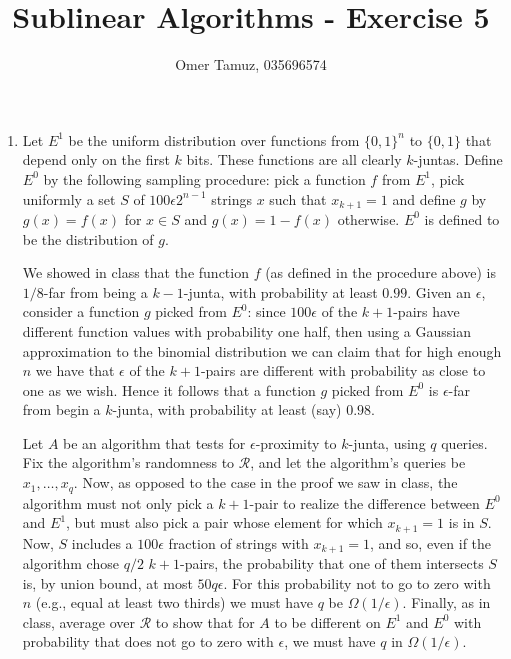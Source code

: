 \documentclass[11pt]{article} \usepackage{amssymb}
\begin{document}
\title{Sublinear Algorithms - Exercise 5}

 \author{Omer Tamuz, 035696574}
\maketitle
\begin{enumerate}
\item 
Let $E^1$ be the uniform distribution over functions from $\{0,1\}^n$ to
$\{0,1\}$ that depend only on the first $k$ bits. These functions are all
clearly $k$-juntas. Define $E^0$ by the following sampling procedure: 
pick a function $f$
from $E^1$, pick uniformly a set $S$ of
$100\epsilon 2^{n-1}$ strings $x$ such that $x_{k+1}=1$ and define $g$ by
$g(x)=f(x)$ for $x\in S$ and 
$g(x)=1-f(x)$ otherwise.
$E^0$ is defined to be the distribution of $g$. 

We showed in class that the function $f$ (as defined in the procedure above)
is $1/8$-far from being a $k-1$-junta, 
with probability at least $0.99$. Given an $\epsilon$, 
consider a function $g$ picked from $E^0$: 
since $100\epsilon$ of the $k+1$-pairs have different function values with 
probability one half, then using a Gaussian approximation to the binomial
distribution we can claim that for high enough $n$ we have that 
$\epsilon$ of the $k+1$-pairs are different with probability as close to one
as we wish. Hence it follows that a function $g$ picked from $E^0$ is 
$\epsilon$-far from begin a $k$-junta, with probability at least (say) $0.98$.

Let $A$ be an algorithm that tests for $\epsilon$-proximity to 
$k$-junta, using $q$ queries. Fix the algorithm's
randomness to $\mathcal{R}$, 
and let the algorithm's queries be $x_1,\ldots,x_q$. Now, as 
opposed to the case in the proof we saw in class, the algorithm must not
only pick a $k+1$-pair to realize the difference between $E^0$ and $E^1$, 
but must also pick a pair whose element for which $x_{k+1}=1$ is in $S$. 
Now, $S$ includes a $100\epsilon$ fraction of strings with $x_{k+1}=1$, and so, even
if the algorithm chose $q/2$ $k+1$-pairs, the probability that one of them
intersects $S$ is, by union bound, at most $50q\epsilon$. For this 
probability not to go to zero with $n$ (e.g., equal at least two thirds) 
we must have $q$ be $\Omega(1/\epsilon)$. Finally, as in class, average over $\mathcal{R}$
to show that for $A$ to be different on $E^1$ and $E^0$ with probability that
does not go to zero with $\epsilon$, we must have $q$ in $\Omega(1/\epsilon)$.


\end{enumerate}
\end{document}
